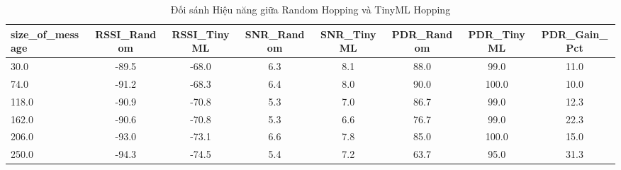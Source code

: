 \begin{table}[htbp]
\centering
\caption{Đối sánh Hiệu năng giữa Random Hopping và TinyML Hopping}
\label{tab:hopping_comp}
\begin{tabular}{lccccccc}
\toprule
size\_of\_message & RSSI\_Random & RSSI\_TinyML & SNR\_Random & SNR\_TinyML & PDR\_Random & PDR\_TinyML & PDR\_Gain\_Pct \\
\midrule
30.0 & -89.5 & -68.0 & 6.3 & 8.1 & 88.0 & 99.0 & 11.0 \\
74.0 & -91.2 & -68.3 & 6.4 & 8.0 & 90.0 & 100.0 & 10.0 \\
118.0 & -90.9 & -70.8 & 5.3 & 7.0 & 86.7 & 99.0 & 12.3 \\
162.0 & -90.6 & -70.8 & 5.3 & 6.6 & 76.7 & 99.0 & 22.3 \\
206.0 & -93.0 & -73.1 & 6.6 & 7.8 & 85.0 & 100.0 & 15.0 \\
250.0 & -94.3 & -74.5 & 5.4 & 7.2 & 63.7 & 95.0 & 31.3 \\
\bottomrule
\end{tabular}
\end{table}
